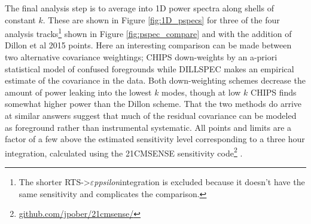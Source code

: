 \documentclass[preprint2]{aastex}
\def\eppsilon{{\it $\varepsilon$ppsilon}}
\def\empirical{DILLSPEC}
\def\dilloncite{Dillon et al 2015 }
\begin{document}
The final analysis step is to average into 1D power spectra along shells of constant $k$. These are shown in Figure \ref{fig:1D_pspecs} for three of the four analysis tracks\footnote{The shorter RTS->\eppsilon integration is excluded because it doesn't have the same sensitivity and complicates the comparison.} shown in Figure \ref{fig:pspec_compare} and with the addition of \dilloncite{} points. Here an interesting comparison can be made between two alternative covariance weightings; CHIPS down-weights by an a-priori statistical model of confused foregrounds while \empirical{} makes an empirical estimate of the covariance in the data. Both down-weighting schemes  decrease the amount of power leaking into the lowest $k$ modes, though at low $k$ CHIPS finds somewhat higher power than the Dillon scheme.  That the two methods do arrive at similar answers suggest that much of the residual covariance can be modeled as foreground rather than instrumental systematic. All points and limits are a factor of a few above the estimated sensitivity level corresponding to a three hour integration, calculated using the 21CMSENSE sensitivity code\footnote{\url{github.com/jpober/21cmsense/}} \cite{Pober:2014p10390}.

\end{document}
